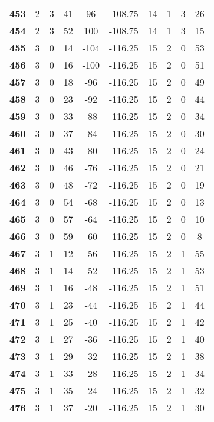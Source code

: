 \documentclass{article}%
\begin{document}
\begin{longtable}{cccccccccc}
        \textbf{453} & 2 & 3 & 41 & 96 & -108.75 & 14 & 1 & 3 & 26 \\ 
        \textbf{454} & 2 & 3 & 52 & 100 & -108.75 & 14 & 1 & 3 & 15 \\ 
        \textbf{455} & 3 & 0 & 14 & -104 & -116.25 & 15 & 2 & 0 & 53 \\ 
        \textbf{456} & 3 & 0 & 16 & -100 & -116.25 & 15 & 2 & 0 & 51 \\ 
        \textbf{457} & 3 & 0 & 18 & -96 & -116.25 & 15 & 2 & 0 & 49 \\ 
        \textbf{458} & 3 & 0 & 23 & -92 & -116.25 & 15 & 2 & 0 & 44 \\ 
        \textbf{459} & 3 & 0 & 33 & -88 & -116.25 & 15 & 2 & 0 & 34 \\ 
        \textbf{460} & 3 & 0 & 37 & -84 & -116.25 & 15 & 2 & 0 & 30 \\ 
        \textbf{461} & 3 & 0 & 43 & -80 & -116.25 & 15 & 2 & 0 & 24 \\ 
        \textbf{462} & 3 & 0 & 46 & -76 & -116.25 & 15 & 2 & 0 & 21 \\ 
        \textbf{463} & 3 & 0 & 48 & -72 & -116.25 & 15 & 2 & 0 & 19 \\ 
        \textbf{464} & 3 & 0 & 54 & -68 & -116.25 & 15 & 2 & 0 & 13 \\ 
        \textbf{465} & 3 & 0 & 57 & -64 & -116.25 & 15 & 2 & 0 & 10 \\ 
        \textbf{466} & 3 & 0 & 59 & -60 & -116.25 & 15 & 2 & 0 & 8 \\ 
        \textbf{467} & 3 & 1 & 12 & -56 & -116.25 & 15 & 2 & 1 & 55 \\ 
        \textbf{468} & 3 & 1 & 14 & -52 & -116.25 & 15 & 2 & 1 & 53 \\ 
        \textbf{469} & 3 & 1 & 16 & -48 & -116.25 & 15 & 2 & 1 & 51 \\ 
        \textbf{470} & 3 & 1 & 23 & -44 & -116.25 & 15 & 2 & 1 & 44 \\ 
        \textbf{471} & 3 & 1 & 25 & -40 & -116.25 & 15 & 2 & 1 & 42 \\ 
        \textbf{472} & 3 & 1 & 27 & -36 & -116.25 & 15 & 2 & 1 & 40 \\ 
        \textbf{473} & 3 & 1 & 29 & -32 & -116.25 & 15 & 2 & 1 & 38 \\ 
        \textbf{474} & 3 & 1 & 33 & -28 & -116.25 & 15 & 2 & 1 & 34 \\ 
        \textbf{475} & 3 & 1 & 35 & -24 & -116.25 & 15 & 2 & 1 & 32 \\ 
        \textbf{476} & 3 & 1 & 37 & -20 & -116.25 & 15 & 2 & 1 & 30 \\ 

\end{longtable}
\end{document}
